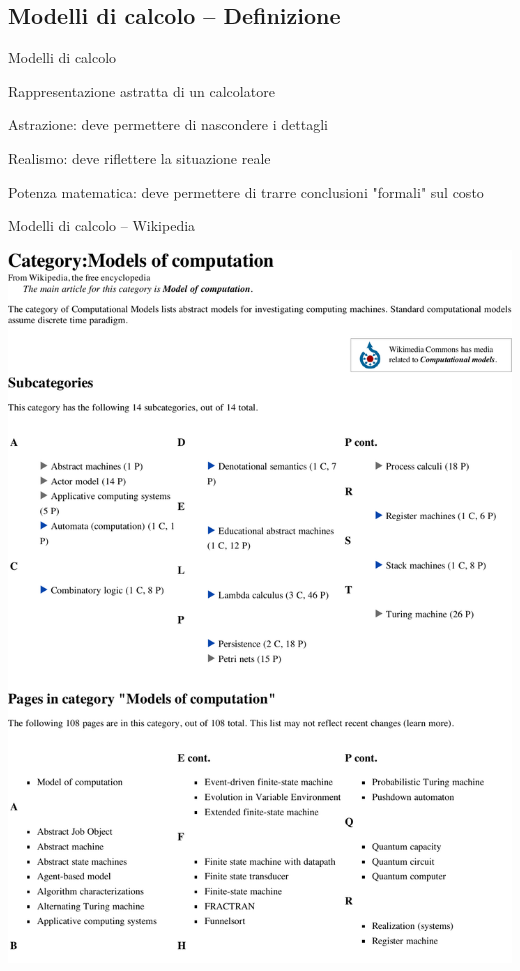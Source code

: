 \subsection{Modelli di calcolo -- Definizione}

\begin{frame}{Modelli di calcolo}

\vspace{-9pt}
\begin{myboxtitle}
Rappresentazione astratta di un calcolatore
\BI
\item \alert{Astrazione}: deve permettere di nascondere i dettagli
\item \alert{Realismo}: deve riflettere la situazione reale
\item \alert{Potenza matematica}: deve permettere di trarre conclusioni "formali" sul costo
\EI
\end{myboxtitle}
\end{frame}


\begin{frame}{Modelli di calcolo -- Wikipedia}

\includegraphics[width=\textwidth]{models.pdf}

\end{frame}

